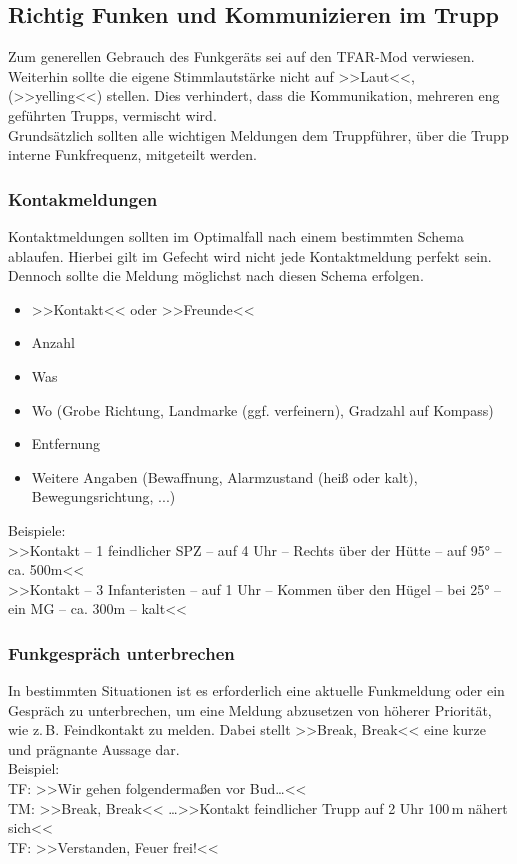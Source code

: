 \subsection{Richtig Funken und Kommunizieren im Trupp}
	Zum generellen Gebrauch des Funkgeräts sei auf den TFAR-Mod verwiesen. Weiterhin sollte die eigene Stimmlautstärke nicht auf >>Laut<<, (>>yelling<<) stellen. Dies verhindert, dass die Kommunikation, mehreren eng geführten Trupps, vermischt wird.\\
	Grundsätzlich sollten alle wichtigen Meldungen dem Truppführer, über die Trupp interne Funkfrequenz, mitgeteilt werden.
 
\subsubsection{Kontakmeldungen}
	Kontaktmeldungen sollten im Optimalfall nach einem bestimmten Schema ablaufen. Hierbei gilt im Gefecht wird nicht jede Kontaktmeldung perfekt sein. Dennoch sollte die Meldung möglichst nach diesen Schema erfolgen.
	\begin{itemize}
		\setlength{\itemsep}{-4pt}
		\itemsep-4pt
		\item >>Kontakt<< oder >>Freunde<<
		\item Anzahl 
		\item Was
		\item Wo (Grobe Richtung, Landmarke (ggf. verfeinern), Gradzahl auf Kompass) 
		\item Entfernung
		\item Weitere Angaben (Bewaffnung, Alarmzustand (heiß oder kalt), Bewegungsrichtung, ...)
	\end{itemize}

	Beispiele:\\
	>>Kontakt -- 1 feindlicher \acs{SPZ} -- auf 4 Uhr -- Rechts über der Hütte -- auf 95° -- ca. 500m<< \\
	>>Kontakt -- 3 Infanteristen -- auf 1 Uhr -- Kommen über den Hügel -- bei 25° -- ein \acs{MG} -- ca. 300m -- kalt<<

\subsubsection{Funkgespräch unterbrechen}
	In bestimmten Situationen ist es erforderlich eine aktuelle Funkmeldung oder ein Gespräch zu unterbrechen, um eine Meldung abzusetzen von höherer Priorität, wie z.\,B. Feindkontakt zu melden. Dabei stellt >>Break, Break<< eine kurze und prägnante Aussage dar.\\
	Beispiel: \\
	TF: >>Wir gehen folgendermaßen vor Bud\dots<<\\
	TM: >>Break, Break<< \dots >>Kontakt feindlicher Trupp auf 2 Uhr 100\,m nähert sich<<\\
	TF: >>Verstanden, Feuer frei!<<

